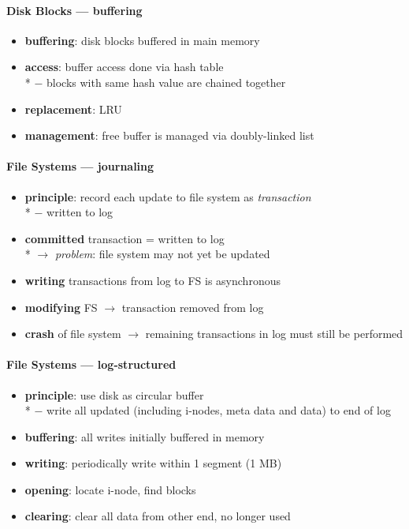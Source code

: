 \paragraph{Disk Blocks --- buffering}
\begin{itemize}
  \item \textbf{buffering}: disk blocks buffered in main memory
  \item \textbf{access}: buffer access done via hash table \\*
    $ - $ blocks with same hash value are chained together
  \item \textbf{replacement}: LRU
  \item \textbf{management}: free buffer is managed via doubly-linked list
\end{itemize}

\paragraph{File Systems --- journaling}
\begin{itemize}
  \item \textbf{principle}: record each update to file system as \emph{transaction} \\*
    $ - $ written to log
  \item \textbf{committed} transaction = written to log \\*
    $ \to $ \emph{problem}: file system may not yet be updated
  \item \textbf{writing} transactions from log to FS is asynchronous
  \item \textbf{modifying} FS $ \to $ transaction removed from log
  \item \textbf{crash} of file system $ \to $ remaining transactions in log must still be performed
\end{itemize}

\paragraph{File Systems --- log-structured}
\begin{itemize}
  \item \textbf{principle}: use disk as circular buffer \\*
    $ - $ write all updated (including i-nodes, meta data and data) to end of log
  \item \textbf{buffering}: all writes initially buffered in memory
  \item \textbf{writing}: periodically write within 1 segment (1 MB)
  \item \textbf{opening}: locate i-node, find blocks
  \item \textbf{clearing}: clear all data from other end, no longer used
\end{itemize}
